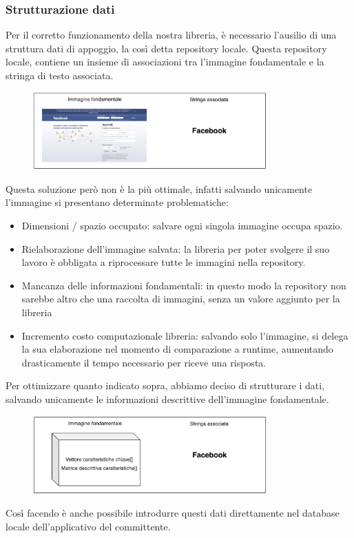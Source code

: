 \documentclass[twoside]{supsistudent}
\newcommand{\Decaa}{\newline\vspace{0.5mm}\newline\noindent}
\begin{document}
\subsubsection{Strutturazione dati}
Per il corretto funzionamento della nostra libreria, è necessario l'ausilio di una struttura dati di appoggio, la così detta repository locale.
\Decaa
Questa repository locale, contiene un insieme di associazioni tra l'immagine fondamentale e la stringa di testo associata.
\begin{figure}[h!]
  \centering
    \includegraphics[width=0.8\textwidth]{Pictures/img_fondamentale.png}
\end{figure}
\newline
Questa soluzione però non è la più ottimale, infatti salvando unicamente l'immagine si presentano determinate problematiche:
\begin{itemize}
\item Dimensioni / spazio occupato: salvare ogni singola immagine occupa spazio.
\item Rielaborazione dell'immagine salvata: la libreria per poter svolgere il suo lavoro è obbligata a riprocessare tutte le immagini nella repository.
\item Mancanza delle informazioni fondamentali: in questo modo la repository non sarebbe altro che una raccolta di immagini, senza un valore aggiunto per la libreria
\item Incremento costo computazionale libreria: salvando solo l'immagine, si delega la sua elaborazione nel momento di comparazione a runtime, aumentando drasticamente il tempo necessario per riceve una risposta.
\end{itemize}
Per ottimizzare quanto indicato sopra, abbiamo deciso di strutturare i dati, salvando unicamente le informazioni descrittive dell'immagine fondamentale.
\begin{figure}[h!]
  \centering
    \includegraphics[width=0.8\textwidth]{Pictures/img_fondamentale_preproc.png}
\end{figure}
\newline
Così facendo è anche possibile introdurre questi dati direttamente nel database locale dell'applicativo del committente.
\end{document}
